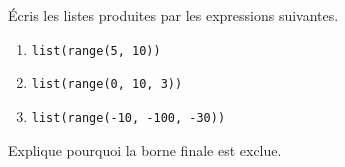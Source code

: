 Écris les listes produites par les expressions suivantes.
\begin{enumerate}
\item \texttt{list(range(5, 10))}
\item \texttt{list(range(0, 10, 3))}
\item \texttt{list(range(-10, -100, -30))}
\end{enumerate}
Explique pourquoi la borne finale est exclue.
